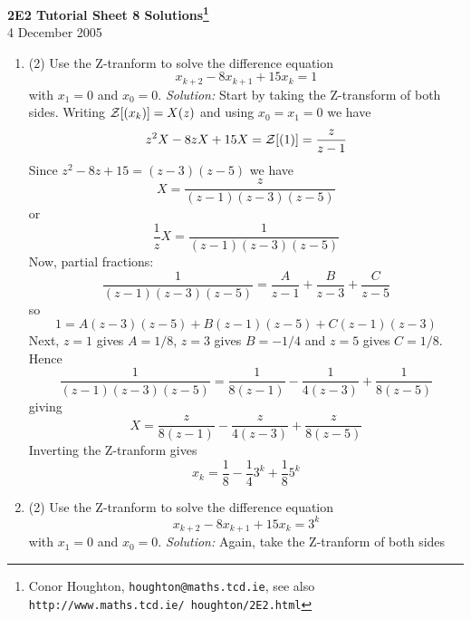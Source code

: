 \documentclass[12pt]{article}
\newcommand\soln{\noindent\textit{Solution:} }
\begin{document}
\begin{center}
{\bf 2E2 Tutorial Sheet 8 Solutions\footnote{Conor Houghton, {\tt houghton@maths.tcd.ie}, see also {\tt http://www.maths.tcd.ie/ houghton/2E2.html}}}\\[1cm]
4 December 2005
\end{center}

\begin{enumerate}
\item (2) Use the Z-tranform to solve the difference equation
\begin{equation}
x_{k+2}-8x_{k+1}+15x_k=1
\end{equation}
with $x_1=0$ and $x_0=0$.
\vskip 1cm
\soln Start by taking the Z-transform of both sides. Writing ${\cal Z}[(x_k)]=X(z)$ and using $x_0=x_1=0$ we have
\begin{equation}
z^2X-8zX+15X={\cal Z}[(1)]=\frac{z}{z-1}
\end{equation}
Since $z^2-8z+15=(z-3)(z-5)$ we have
\begin{equation}
X=\frac{z}{(z-1)(z-3)(z-5)}
\end{equation}
or
\begin{equation}
\frac{1}{z}X=\frac{1}{(z-1)(z-3)(z-5)}
\end{equation}
Now, partial fractions:
\begin{equation}
\frac{1}{(z-1)(z-3)(z-5)}=\frac{A}{z-1}+\frac{B}{z-3}+\frac{C}{z-5}
\end{equation}
so
\begin{equation}
1=A(z-3)(z-5)+B(z-1)(z-5)+C(z-1)(z-3)
\end{equation}
Next, $z=1$ gives $A=1/8$, $z=3$ gives $B=-1/4$ and $z=5$ gives $C=1/8$. Hence
\begin{equation}
\frac{1}{(z-1)(z-3)(z-5)}=\frac{1}{8(z-1)}-\frac{1}{4(z-3)}+\frac{1}{8(z-5)}
\end{equation}
giving
\begin{equation}
X=\frac{z}{8(z-1)}-\frac{z}{4(z-3)}+\frac{z}{8(z-5)}
\end{equation}
Inverting the Z-tranform gives
\begin{equation}
x_k=\frac{1}{8}-\frac{1}{4}3^k+\frac{1}{8}5^k
\end{equation}
\vskip 1cm
\item (2) Use the Z-tranform to solve the difference equation
\begin{equation}
x_{k+2}-8x_{k+1}+15x_k=3^k
\end{equation}
with $x_1=0$ and $x_0=0$.
\vskip 1cm
\soln Again, take the Z-tranform of both sides

\end{enumerate}
\end{document}
